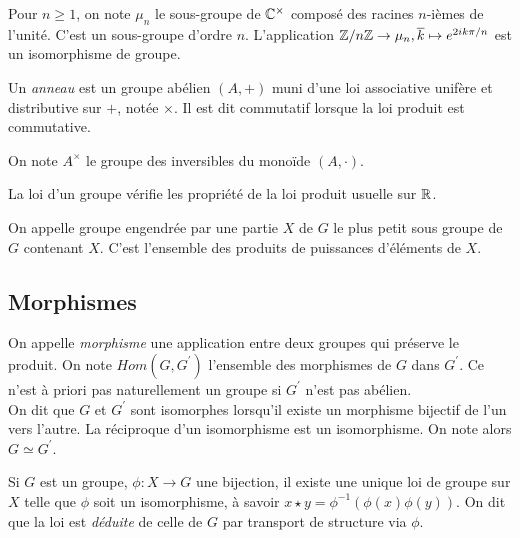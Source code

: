 \documentclass{cours}
\begin{document}
\begin{example}
        Pour $n \geq 1$, on note $\mu_{n}$ le sous-groupe de $\mathbb{C}^{\times}$ composé des racines $n$-ièmes de l'unité. C'est un sous-groupe d'ordre $n$. L'application $\mathbb{Z}/n\mathbb{Z} \rightarrow \mu_{n}, \overline{k} \mapsto e^{2ik\pi/n}$ est un isomorphisme de groupe. 
\end{example}

\begin{definition}
    Un \emph{anneau} est un groupe abélien $(A, +)$ muni d'une loi associative unifère et distributive sur $+$, notée $\times$. Il est dit commutatif lorsque la loi produit est commutative.
\end{definition}

\begin{definition}
    On note $A^{\times}$ le groupe des inversibles du monoïde $(A, \cdot)$.
\end{definition}

\begin{proposition}
    La loi d'un groupe vérifie les propriété de la loi produit usuelle sur $\mathbb{R}$.
\end{proposition}

\begin{definition}
    On appelle groupe engendrée par une partie $X$ de $G$ le plus petit sous groupe de $G$ contenant $X$. C'est l'ensemble des produits de puissances d'éléments de $X$.
\end{definition}

\subsection{Morphismes}
\begin{definition}
    On appelle \emph{morphisme} une application entre deux groupes qui préserve le produit. On note $Hom(G, G^{'})$ l'ensemble des morphismes de $G$ dans $G^{'}$. Ce n'est à priori pas naturellement un groupe si $G^{'}$ n'est pas abélien.  \\
    On dit que $G$ et $G^{'}$ sont isomorphes lorsqu'il existe un morphisme bijectif de l'un vers l'autre. La réciproque d'un isomorphisme est un isomorphisme. On note alors $G \simeq G^{'}$.
\end{definition}

\begin{proposition}\label{transport}
    Si $G$ est un groupe, $\phi : X \rightarrow G$ une bijection, il existe une unique loi de groupe sur $X$ telle que $\phi$ soit un isomorphisme, à savoir $x \star y = \phi^{-1}(\phi(x)\phi(y))$. On dit que la loi est \emph{déduite} de celle de $G$ par transport de structure via $\phi$.
\end{proposition}
\end{document}
